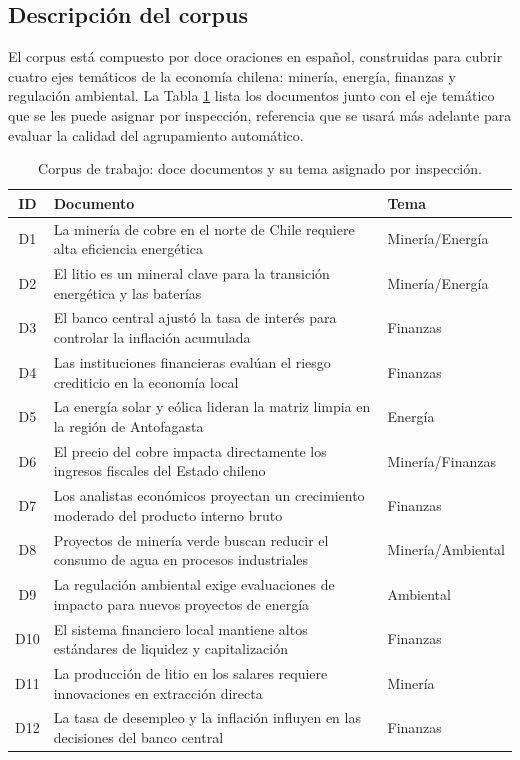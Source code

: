 \documentclass[12pt, a4paper]{article}
\begin{document}
\subsection{Descripción del corpus}

El corpus está compuesto por doce oraciones en español, construidas para cubrir cuatro ejes
temáticos de la economía chilena: minería, energía, finanzas y regulación ambiental. La Tabla
\ref{tab:corpus} lista los documentos junto con el eje temático que se les puede asignar por
inspección, referencia que se usará más adelante para evaluar la calidad del agrupamiento
automático.

\begin{table}[H]
\centering
\caption{Corpus de trabajo: doce documentos y su tema asignado por inspección.}
\label{tab:corpus}
\small
\renewcommand{\arraystretch}{1.15}
\begin{tabular}{@{}cp{9.2cm}l@{}}
\toprule
\textbf{ID} & \textbf{Documento} & \textbf{Tema} \\
\midrule
D1  & La minería de cobre en el norte de Chile requiere alta eficiencia energética & Minería/Energía \\
D2  & El litio es un mineral clave para la transición energética y las baterías & Minería/Energía \\
D3  & El banco central ajustó la tasa de interés para controlar la inflación acumulada & Finanzas \\
D4  & Las instituciones financieras evalúan el riesgo crediticio en la economía local & Finanzas \\
D5  & La energía solar y eólica lideran la matriz limpia en la región de Antofagasta & Energía \\
D6  & El precio del cobre impacta directamente los ingresos fiscales del Estado chileno & Minería/Finanzas \\
D7  & Los analistas económicos proyectan un crecimiento moderado del producto interno bruto & Finanzas \\
D8  & Proyectos de minería verde buscan reducir el consumo de agua en procesos industriales & Minería/Ambiental \\
D9  & La regulación ambiental exige evaluaciones de impacto para nuevos proyectos de energía & Ambiental \\
D10 & El sistema financiero local mantiene altos estándares de liquidez y capitalización & Finanzas \\
D11 & La producción de litio en los salares requiere innovaciones en extracción directa & Minería \\
D12 & La tasa de desempleo y la inflación influyen en las decisiones del banco central & Finanzas \\
\bottomrule
\end{tabular}
\end{table}
\end{document}
